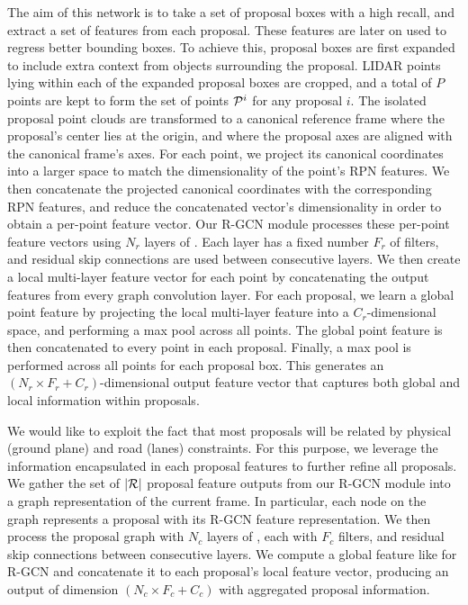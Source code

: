 \documentclass[10pt,twocolumn,letterpaper]{article}
\begin{document}
The aim of this network is to take a set of proposal boxes \Bc with a high recall, and extract a set of features from each proposal.
These features are later on used to regress better bounding boxes.
To achieve this, proposal boxes are first expanded to include extra context from objects surrounding the proposal.
LIDAR points lying within each of the expanded proposal boxes are cropped, and a total of $P$ points are kept to form the set of points $\mathcal{P}^i$ for any proposal $i$.
The isolated proposal point clouds are transformed to a canonical reference frame where the proposal's center lies at the origin, and where the proposal axes are aligned with the canonical frame's axes.
For each point, we project its canonical coordinates into a larger space to match the dimensionality of the point's RPN features.
We then concatenate the projected canonical coordinates with the corresponding RPN features, and reduce the concatenated vector's dimensionality in order to obtain a per-point feature vector.
Our R-GCN module processes these per-point feature vectors using $N_r$ layers of \MRGCN. 
Each layer has a fixed number $F_r$ of filters, and residual skip connections are used between consecutive layers.
We then create a local multi-layer feature vector for each point by concatenating the output features from every graph convolution layer.
For each proposal, we learn a global point feature by projecting the local multi-layer feature into a $C_r$-dimensional space, and performing a max pool across all points.
The global point feature is then concatenated to every point in each proposal.
Finally, a max pool is performed across all points for each proposal box.
This generates an $(N_r \times F_r + C_r)$-dimensional output feature vector that captures both global and local information within proposals.





We would like to exploit the fact that most proposals will be related by physical (\eg ground plane) and road (\eg lanes) constraints.
For this purpose, we leverage the information encapsulated in each proposal features to further refine all proposals.
We gather the set of $\vert \mathcal{R} \vert$ proposal feature outputs from our R-GCN module into a graph representation of the current frame.
In particular, each node on the graph represents a proposal with its R-GCN feature representation.
We then process the proposal graph with $N_c$ layers of \EdgeConv, each with $F_c$ filters, and residual skip connections between consecutive layers.
We compute a global feature like for R-GCN and concatenate it to each proposal's local feature vector,  producing an output of dimension $(N_c \times F_c + C_c)$ with aggregated proposal information.
\end{document}
